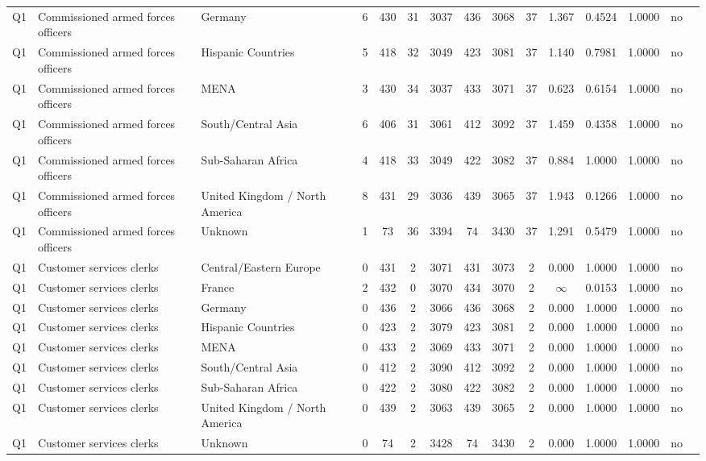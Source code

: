 \begin{longtable}{lllrcccccccccll}
Q1 & Commissioned armed forces officers & Germany & 6 & 430 & 31 & 3037 & 436 & 3068 & 37 & 1.367 & 0.4524 & 1.0000 & no \\
Q1 & Commissioned armed forces officers & Hispanic Countries & 5 & 418 & 32 & 3049 & 423 & 3081 & 37 & 1.140 & 0.7981 & 1.0000 & no \\
Q1 & Commissioned armed forces officers & MENA & 3 & 430 & 34 & 3037 & 433 & 3071 & 37 & 0.623 & 0.6154 & 1.0000 & no \\
Q1 & Commissioned armed forces officers & South/Central Asia & 6 & 406 & 31 & 3061 & 412 & 3092 & 37 & 1.459 & 0.4358 & 1.0000 & no \\
Q1 & Commissioned armed forces officers & Sub-Saharan Africa & 4 & 418 & 33 & 3049 & 422 & 3082 & 37 & 0.884 & 1.0000 & 1.0000 & no \\
Q1 & Commissioned armed forces officers & United Kingdom / North America & 8 & 431 & 29 & 3036 & 439 & 3065 & 37 & 1.943 & 0.1266 & 1.0000 & no \\
Q1 & Commissioned armed forces officers & Unknown & 1 & 73 & 36 & 3394 & 74 & 3430 & 37 & 1.291 & 0.5479 & 1.0000 & no \\
Q1 & Customer services clerks & Central/Eastern Europe & 0 & 431 & 2 & 3071 & 431 & 3073 & 2 & 0.000 & 1.0000 & 1.0000 & no \\
Q1 & Customer services clerks & France & 2 & 432 & 0 & 3070 & 434 & 3070 & 2 & $\infty$ & 0.0153 & 1.0000 & no \\
Q1 & Customer services clerks & Germany & 0 & 436 & 2 & 3066 & 436 & 3068 & 2 & 0.000 & 1.0000 & 1.0000 & no \\
Q1 & Customer services clerks & Hispanic Countries & 0 & 423 & 2 & 3079 & 423 & 3081 & 2 & 0.000 & 1.0000 & 1.0000 & no \\
Q1 & Customer services clerks & MENA & 0 & 433 & 2 & 3069 & 433 & 3071 & 2 & 0.000 & 1.0000 & 1.0000 & no \\
Q1 & Customer services clerks & South/Central Asia & 0 & 412 & 2 & 3090 & 412 & 3092 & 2 & 0.000 & 1.0000 & 1.0000 & no \\
Q1 & Customer services clerks & Sub-Saharan Africa & 0 & 422 & 2 & 3080 & 422 & 3082 & 2 & 0.000 & 1.0000 & 1.0000 & no \\
Q1 & Customer services clerks & United Kingdom / North America & 0 & 439 & 2 & 3063 & 439 & 3065 & 2 & 0.000 & 1.0000 & 1.0000 & no \\
Q1 & Customer services clerks & Unknown & 0 & 74 & 2 & 3428 & 74 & 3430 & 2 & 0.000 & 1.0000 & 1.0000 & no \\

\end{longtable}
